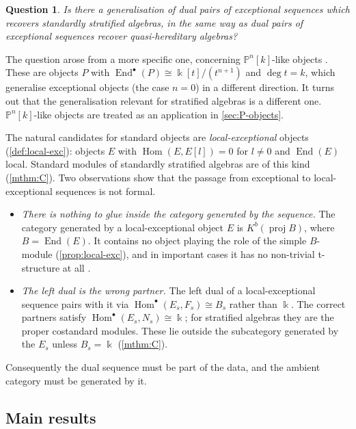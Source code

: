 \documentclass[11pt,reqno]{amsart}
\theoremstyle{plain}
\newtheorem{question}[theorem]{Question}
\theoremstyle{definition}
\theoremstyle{remark}
\newcommand{\kk}{\Bbbk}
\DeclareMathOperator{\Hom}{Hom}
\DeclareMathOperator{\End}{End}
\newcommand{\proj}{\operatorname{proj}}
\newcommand{\Kb}{K^b}
\newcommand{\Pn}[2]{\mathbb{P}^{#1}[#2]}
\begin{document}
\begin{question}\label{q:main}
Is there a generalisation of dual pairs of exceptional sequences which recovers standardly stratified algebras, in the same way as dual pairs of exceptional sequences recover quasi-hereditary algebras?
\end{question}

The question arose from a more specific one, concerning $\Pn nk$-like objects \cite{HT06,Kru18,HK19}. These are objects $P$ with $\End^\bullet(P)\cong\kk[t]/(t^{n+1})$ and $\deg t=k$, which generalise exceptional objects (the case $n=0$) in a different direction. It turns out that the generalisation relevant for stratified algebras is a different one. $\Pn nk$-like objects are treated as an application in \cref{sec:P-objects}.

The natural candidates for standard objects are \emph{local-exceptional} objects (\cref{def:local-exc}): objects $E$ with $\Hom(E,E[l])=0$ for $l\ne0$ and $\End(E)$ local. Standard modules of standardly stratified algebras are of this kind (\cref{mthm:C}). Two observations show that the passage from exceptional to local-exceptional sequences is not formal.
\begin{itemize}
\item \emph{There is nothing to glue inside the category generated by the sequence.} The category generated by a local-exceptional object $E$ is $\Kb(\proj B)$, where $B=\End(E)$. It contains no object playing the role of the simple $B$-module (\cref{prop:local-exc}), and in important cases it has no non-trivial t-structure at all \cite{HJY13,Bonf26}.
\item \emph{The left dual is the wrong partner.} The left dual of a local-exceptional sequence pairs with it via $\Hom^\bullet(E_s,F_s)\cong B_s$ rather than $\kk$. The correct partners satisfy $\Hom^\bullet(E_s,N_s)\cong\kk$; for stratified algebras they are the proper costandard modules. These lie outside the subcategory generated by the $E_s$ unless $B_s=\kk$ (\cref{mthm:C}).
\end{itemize}
Consequently the dual sequence must be part of the data, and the ambient category must be generated by it.

\subsection{Main results}
\end{document}
